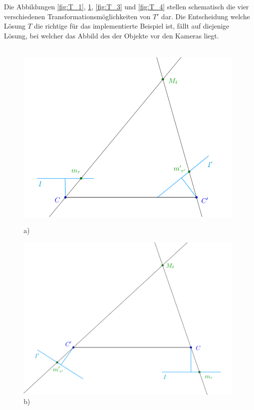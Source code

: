 Die Abbildungen \ref{fig:T_1}, \ref{fig:T_2}, \ref{fig:T_3} und \ref{fig:T_4} stellen schematisch die vier verschiedenen Transformationsmöglichkeiten von $T'$ dar.  Die Entscheidung welche Lösung $T$ die richtige für das implementierte Beispiel ist, fällt auf diejenige Lösung, bei welcher das Abbild des der Objekte vor den Kameras liegt.\\\\


\begin{figure}[!htb]
	\includegraphics[width=\linewidth]{images/P_Solution_one.png}
	\caption{a)}
	\label{fig:T_1}
	\endminipage\hfill
	\includegraphics[width=\linewidth]{images/P_Solution_two.png}
	\caption{b)}
	\label{fig:T_2}
	\endminipage\hfill
\end{figure}

